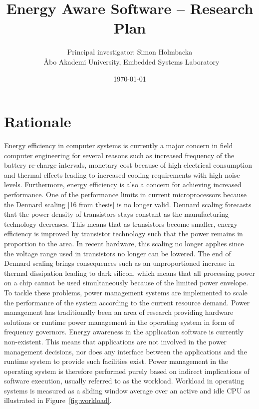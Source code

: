 \documentclass{article}
\title{Energy Aware Software -- Research Plan} %
\author{Principal investigator: Simon Holmbacka\\ \AA{}bo Akademi University, Embedded Systems Laboratory} %
\date{\today} %
\begin{document}
\maketitle %

\section{Rationale}
Energy efficiency in computer systems is currently a major concern in field computer engineering for several reasons such as increased frequency of the battery re-charge intervals, 
monetary cost because of high electrical consumption and thermal effects leading to increased cooling requirements with high noise levels. 
Furthermore, energy efficiency is also a concern for achieving increased performance. 
One of the performance limits in current microprocessors because the Dennard scaling [16 from thesis] is no longer valid. 
Dennard scaling forecasts that the power density of transistors stays constant as the manufacturing technology decreases. 
This means that as transistors become smaller, energy efficiency is improved by transistor technology such that the power remains in proportion to the area. 
In recent hardware, this scaling no longer applies since the voltage range used in transistors no longer can be lowered. 
The end of Dennard scaling brings consequences such as an unproportioned increase in thermal dissipation leading to dark silicon, 
which means that all processing power on a chip cannot be used simultaneously because of the limited power envelope.
To tackle these problems, power management systems are implemented to scale the performance of the system according to the current resource demand. 
Power management has traditionally been an area of research providing hardware solutions or runtime power management in the operating system in form of frequency governors. 
Energy awareness in the application software is currently non-existent. This means that applications are not involved in the power management decisions, 
nor does any interface between the applications and the runtime system to provide such facilities exist. 
Power management in the operating system is therefore performed purely based on indirect implications of software execution, usually referred to as the workload. 
Workload in operating systems is measured as a sliding window average over an active and idle CPU as illustrated in Figure~\ref{fig:workload}. 
\end{document}
